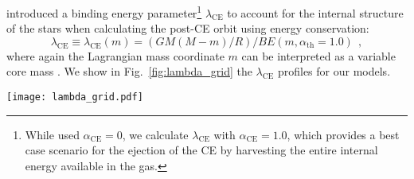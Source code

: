 \documentclass[twocolumn,twocolappendix,trackchanges]{aastex63}
\DeclareRobustCommand{\Figref}[1]{Fig.~\ref{#1}}
\begin{document}
\cite{dekool:1990} introduced a binding energy
parameter\footnote{While \cite{dekool:1990} used
  $\alpha_\mathrm{CE}=0$, we calculate $\lambda_\mathrm{CE}$ with
  $\alpha_\mathrm{CE}=1.0$, which provides a best case scenario for
  the ejection of the CE by harvesting the entire internal energy
  available in the gas.}
$\lambda_\mathrm{CE}$ to account for the internal structure of the
stars when calculating the post-CE orbit using energy conservation:
\begin{equation}
  \label{eq:lambda}
  \lambda_\mathrm{CE} \equiv \lambda_\mathrm{CE}(m) = (GM(M-m)/R)/BE(m, \alpha_\mathrm{th}=1.0) \ \ ,
\end{equation}
where again the Lagrangian mass coordinate $m$ can be interpreted as a
variable core mass \citep[see also][]{demarco:11, ivanova:2013}. We show
in \Figref{fig:lambda_grid} the $\lambda_\mathrm{CE}$ profiles for our models.

\begin{figure*}[htbp]
  \centering
  \texttt{[image: lambda\_grid.pdf]}
  \caption{Profile of the binding energy parameter
    $\lambda_\mathrm{CE}$ as a function of mass coordinate for
    accretors (orange), single stars (red), and our engineered stars
    (other colors) at selected total radii. The vertical dashed lines
    mark $M_\mathrm{He}$, that is the outermost location where
    $X<0.01$ and $Y>0.1$.}
  \label{fig:lambda_grid}
\end{figure*}



\end{document}

